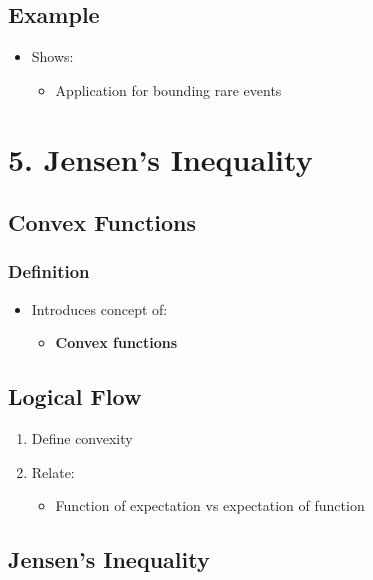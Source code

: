 \documentclass[12pt]{article}
\begin{document}
\subsection*{Example}

\begin{itemize}
    \item Shows:
    \begin{itemize}
        \item Application for bounding rare events
    \end{itemize}
\end{itemize}

\section*{5. Jensen’s Inequality}

\subsection*{Convex Functions}

\subsubsection*{Definition}

\begin{itemize}
    \item Introduces concept of:
    \begin{itemize}
        \item \textbf{Convex functions}
    \end{itemize}
\end{itemize}

\subsection*{Logical Flow}

\begin{enumerate}
    \item Define convexity
    \item Relate:
    \begin{itemize}
        \item Function of expectation vs expectation of function
    \end{itemize}
\end{enumerate}

\subsection*{Jensen’s Inequality}
\end{document}
